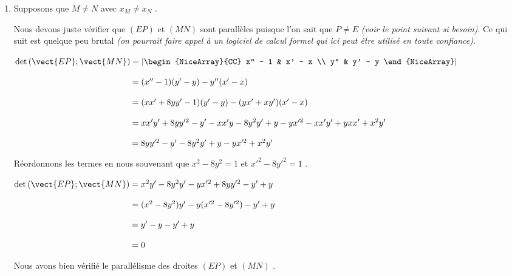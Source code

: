 \begin{enumerate}
	\item Supposons que $M \neq N$ avec $x_M \neq x_N$ .
	
	\smallskip
	
	\noindent
	Nous devons juste vérifier que $(EP)$ et $(MN)$ sont parallèles puisque l'on sait que $P \neq E$ \textit{(voir le point suivant si besoin)}. Ce qui suit est quelque peu brutal \textit{(on pourrait faire appel à un logiciel de calcul formel qui ici peut être utilisé en toute confiance)}.
	
	\smallskip
	
	\noindent
	$\det\left ( \vect{EP} ; \vect{MN} \right)
	=
	\left|\begin{NiceArray}{CC} 
	  x'' - 1 & x' - x \\ 
	  y''     & y' - y
	\end{NiceArray}\right|$
	
	\noindent
	$\phantom{\det\left ( \vect{EP} ; \vect{MN} \right)}
	=
	(x'' - 1)(y' - y) -  y'' (x' - x)$
	
	\noindent
	$\phantom{\det\left ( \vect{EP} ; \vect{MN} \right)}
	=
	(x x' + 8 y y' - 1)(y' - y) -  (y x' + x y') (x' - x)$
	
	\noindent
	$\phantom{\det\left ( \vect{EP} ; \vect{MN} \right)}
	=
	x x' y' + 8 y y'^2 - y' - x x' y - 8 y^2 y' + y
	- 
	y x'^2 - x x' y' + y x x' + x^2 y'$
	
	\noindent
	$\phantom{\det\left ( \vect{EP} ; \vect{MN} \right)}
	=
	8 y y'^2 - y' - 8 y^2 y' + y
	- 
	y x'^2 + x^2 y'$
	
	\smallskip
	
	\noindent
	Réordonnons les termes en nous souvenant que $x^2 - 8 y^2 = 1$ et $x'^2 - 8 y'^2 = 1$ .

	\smallskip
	
	\noindent
	${\det\left ( \vect{EP} ; \vect{MN} \right)}
	=
	x^2 y' - 8 y^2 y'
	- y x'^2 + 8 y y'^2
	- y' + y$
	
	\noindent
	$\phantom{\det\left ( \vect{EP} ; \vect{MN} \right)}
	=
	(x^2 - 8 y^2)y'
	- y(x'^2 - 8 y'^2)
	- y' + y$
	
	\noindent
	$\phantom{\det\left ( \vect{EP} ; \vect{MN} \right)}
	=
	y'
	- y
	- y' + y$
	
	\noindent
	$\phantom{\det\left ( \vect{EP} ; \vect{MN} \right)}
	=
	0$
	
	\smallskip
	
	\noindent
	Nous avons bien vérifié le parallélisme des droites $(EP)$ et $(MN)$ .


\end{enumerate}
